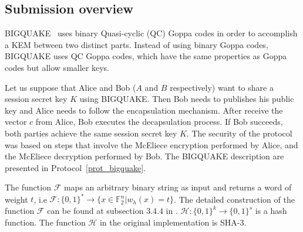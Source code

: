 \label{sec:attack}
\subsection{Submission overview}
BIGQUAKE~\cite{bardet2017big} uses binary Quasi-cyclic (QC) Goppa codes in order to accomplish a KEM between two distinct parts. Instead of using binary Goppa codes, BIGQUAKE uses QC Goppa codes, which have the same properties as Goppa codes but allow smaller keys.

Let us suppose that Alice and Bob ($A$ and $B$ respectively) want to share a session secret key $K$ using BIGQUAKE. Then Bob needs to publishes his public key and Alice needs to follow the encapsulation mechanism. After receive the vector $c$ from Alice, Bob executes the decapsulation process. If Bob succeeds, both parties achieve the same session secret key $K$. The security of the protocol was based on steps that involve the McEliece encryption performed by Alice, and the McEliece decryption performed by Bob. The BIGQUAKE description are presented in Protocol~\ref{prot_bigquake}.

The function $\mathcal{F}$ maps an arbitrary binary string as input and returns a word of weight $t$, i.e $\mathcal{F}: \{0,1\}^* \to \{x \in \mathbb{F}^n_2 | w_h(x) = t\}$. The detailed construction of the function $\mathcal{F}$ can be found at subsection $3.4.4$ in \cite{bardet2017big}. $\mathcal{H} : \{0,1\}^k \to \{0,1\}^s$ is a hash function. The function $\mathcal{H}$ in the original implementation is SHA-3. 



